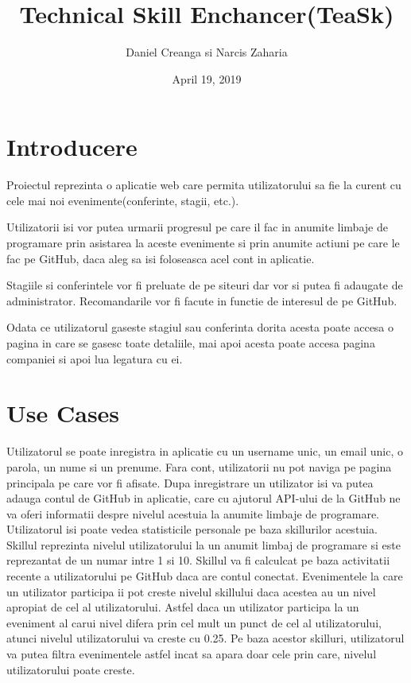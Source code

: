 \documentclass{article}
\title{Technical Skill Enchancer(TeaSk)}
\author{Daniel Creanga si Narcis Zaharia}
\date{April 19, 2019}
\begin{document}
\maketitle
\bigskip
\tableofcontents
\break


\section{Introducere}
Proiectul reprezinta o aplicatie web care permita utilizatorului sa fie la curent cu cele mai noi evenimente(conferinte, stagii, etc.). 

Utilizatorii isi vor putea urmarii progresul pe care il fac in anumite limbaje de programare prin asistarea la aceste evenimente si prin anumite actiuni pe care le fac pe GitHub, daca aleg sa isi foloseasca acel cont in aplicatie.

Stagiile si conferintele vor fi preluate de pe siteuri dar vor si putea fi adaugate de administrator. Recomandarile vor fi facute in functie de interesul de pe GitHub.

Odata ce utilizatorul gaseste stagiul sau conferinta dorita acesta poate accesa o pagina in care se gasesc toate detaliile, mai apoi acesta poate accesa pagina companiei si apoi lua legatura cu ei. 

\bigskip

\section{Use Cases}

Utilizatorul se poate inregistra in aplicatie cu un username unic, un email unic, o parola, un nume si un prenume. Fara cont, utilizatorii nu pot naviga pe pagina principala pe care vor fi afisate. Dupa inregistrare un utilizator isi va putea adauga contul de GitHub in aplicatie, care cu ajutorul API-ului de la GitHub ne va oferi informatii despre nivelul acestuia la anumite limbaje de programare.
Utilizatorul isi poate vedea statisticile personale pe baza skillurilor acestuia. Skillul reprezinta nivelul utilizatorului la un anumit limbaj de programare si este reprezantat de un numar intre 1 si 10.
Skillul va fi calculcat pe baza activitatii recente a utilizatorului pe GitHub daca are contul conectat. Evenimentele la care un utilizator participa ii pot creste nivelul skillului daca acestea au un nivel apropiat de cel al utilizatorului. Astfel daca un utilizator participa la un eveniment al carui nivel difera prin cel mult un punct de cel al utilizatorului, atunci nivelul utilizatorului va creste cu 0.25.
Pe baza acestor skilluri, utilizatorul va putea filtra evenimentele astfel incat sa apara doar cele prin care, nivelul utilizatorului poate creste.
\end{document}
